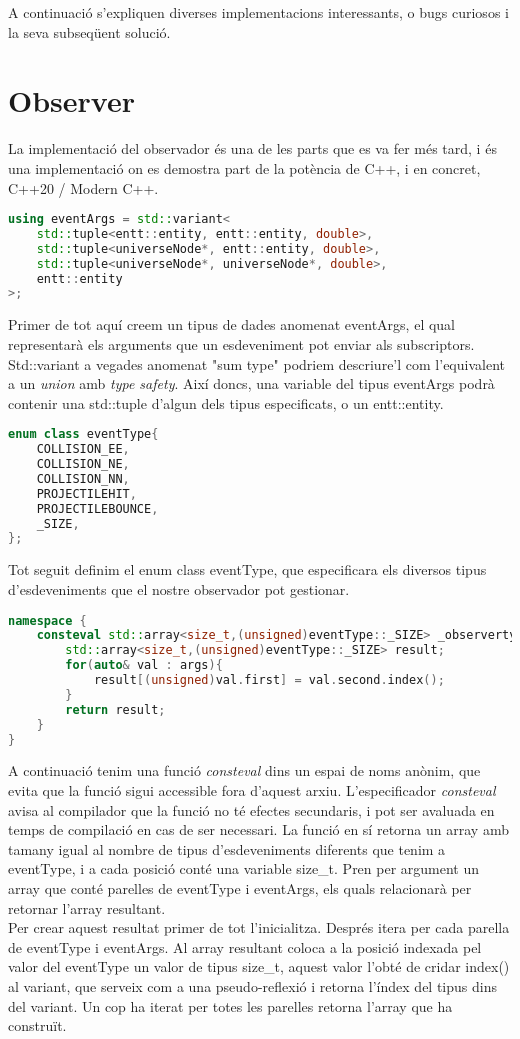 A continuació s'expliquen diverses implementacions interessants, o bugs curiosos i la seva subseqüent solució.
\section{Observer}
La implementació del observador és una de les parts que es va fer més tard, i és una implementació on es demostra part de la potència de C++, i en concret, C++20 / Modern C++.
\\
\begin{lstlisting}[language=C++]
using eventArgs = std::variant<
	std::tuple<entt::entity, entt::entity, double>,
	std::tuple<universeNode*, entt::entity, double>,
	std::tuple<universeNode*, universeNode*, double>,
	entt::entity
>;
\end{lstlisting}
Primer de tot aquí creem un tipus de dades anomenat eventArgs, el qual representarà els arguments que un esdeveniment pot enviar als subscriptors.
Std::variant a vegades anomenat "sum type" podriem descriure'l com l'equivalent a un \textit{union} amb \textit{type safety}. 
Així doncs, una variable del tipus eventArgs podrà contenir una std::tuple d'algun dels tipus especificats, o un entt::entity.
\\
\begin{lstlisting}[language=C++]
enum class eventType{
	COLLISION_EE,
	COLLISION_NE,
	COLLISION_NN,
	PROJECTILEHIT,
	PROJECTILEBOUNCE,
	_SIZE,
};
\end{lstlisting}
Tot seguit definim el enum class eventType, que especificara els diversos tipus d'esdeveniments que el nostre observador pot gestionar.
\\
\begin{lstlisting}[language=C++]
namespace {
	consteval std::array<size_t,(unsigned)eventType::_SIZE> _observertypetable(std::array<std::pair<eventType,eventArgs>,(unsigned)eventType::_SIZE> args){
		std::array<size_t,(unsigned)eventType::_SIZE> result;
		for(auto& val : args){
			result[(unsigned)val.first] = val.second.index();
		}
		return result;
	}
}
\end{lstlisting}
A continuació tenim una funció \textit{consteval} dins un espai de noms anònim, que evita que la funció sigui accessible fora d'aquest arxiu.
L'especificador \textit{consteval} avisa al compilador que la funció no té efectes secundaris, i pot ser avaluada en temps de compilació en cas de ser necessari.
La funció en sí retorna un array amb tamany igual al nombre de tipus d'esdeveniments diferents que tenim a eventType, i a cada posició conté una variable size\_t. 
Pren per argument un array que conté parelles de eventType i eventArgs, els quals relacionarà per retornar l'array resultant.
\\
Per crear aquest resultat primer de tot l'inicialitza.
Després itera per cada parella de eventType i eventArgs.
Al array resultant coloca a la posició indexada pel valor del eventType un valor de tipus size\_t, aquest valor l'obté de cridar index() al variant, que serveix com a una pseudo-reflexió i retorna l'índex del tipus dins del variant.
Un cop ha iterat per totes les parelles retorna l'array que ha construït.

